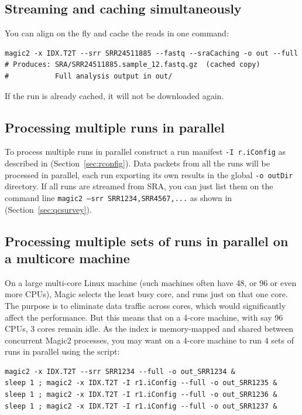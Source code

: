 \documentclass[11pt]{article}
\newcommand{\code}[1]{\texttt{#1}}
\begin{document}
\subsection{Streaming and caching simultaneously}

You can align on the fly and cache the reads in one command:
\begin{lstlisting}
magic2 -x IDX.T2T --srr SRR24511885 --fastq --sraCaching -o out --full
# Produces: SRA/SRR24511885.sample_12.fastq.gz  (cached copy)
#           Full analysis output in out/
\end{lstlisting}

If the run is already cached, it will not be downloaded again.

\subsection{Processing multiple runs in parallel}

To process multiple runs in parallel
construct a run manifest \code{-I r.iConfig} as described in (Section~\ref{sec:rconfig}).
Data packets from all the runs will be processed in parallel, each run exporting its own
results in the global \code{-o outDir} directory. If all runs are streamed from SRA,
you can just list them on the command line \code {magic2 --srr SRR1234,SRR4567,...} 
as shown in (Section~\ref{sec:qcsurvey}).

\subsection{Processing multiple sets of runs in parallel on a multicore machine}

On a large multi-core Linux machine (such machines often have 48, or 96 or even more CPUs),
Magic selects the least busy core, and runs just on that one core. The purpose is to
eliminate data traffic across cores, which would significantly affect the performance.
But this means that on a 4-core machine, with say 96 CPUs, 3 cores remain idle.
As the index is memory-mapped and shared between
concurrent Magic2 processes, you may want on a 4-core machine to run 4 sets of runs in parallel
using the script:
\begin{lstlisting}
magic2 -x IDX.T2T --srr SRR1234 --full -o out_SRR1234 &
sleep 1 ; magic2 -x IDX.T2T -I r1.iConfig --full -o out_SRR1235 &
sleep 1 ; magic2 -x IDX.T2T -I r1.iConfig --full -o out_SRR1236 &
sleep 1 ; magic2 -x IDX.T2T -I r1.iConfig --full -o out_SRR1237 &
\end{lstlisting}
\end{document}
